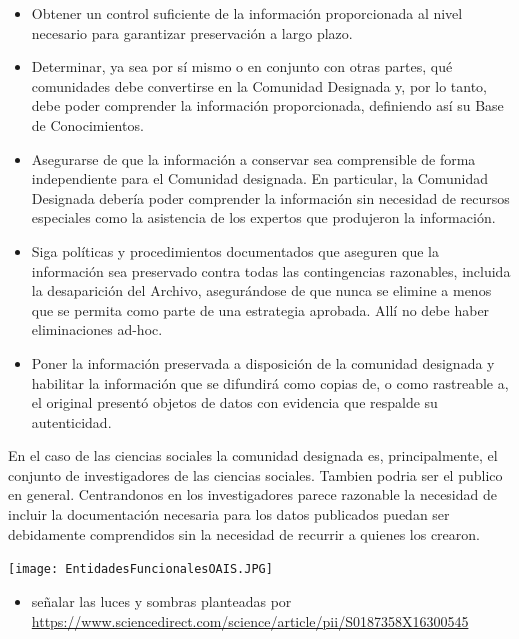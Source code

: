 \documentclass[
  14pt,
]{book}
\providecommand{\tightlist}{%
  \setlength{\itemsep}{0pt}\setlength{\parskip}{0pt}}
\let\origfigure\figure
\let\endorigfigure\endfigure
\renewenvironment{figure}[1][2] {
  \expandafter\origfigure\expandafter[H]
} {
  \endorigfigure
}
\begin{document}
\begin{itemize}
\item
  Obtener un control suficiente de la información proporcionada al nivel necesario para garantizar preservación a largo plazo.
\item
  Determinar, ya sea por sí mismo o en conjunto con otras partes, qué comunidades
  debe convertirse en la Comunidad Designada y, por lo tanto, debe poder
  comprender la información proporcionada, definiendo así su Base de Conocimientos.
\item
  Asegurarse de que la información a conservar sea comprensible de forma independiente para el
  Comunidad designada. En particular, la Comunidad Designada debería poder
  comprender la información sin necesidad de recursos especiales como la asistencia de
  los expertos que produjeron la información.
\item
  Siga políticas y procedimientos documentados que aseguren que la información sea
  preservado contra todas las contingencias razonables, incluida la desaparición del Archivo,
  asegurándose de que nunca se elimine a menos que se permita como parte de una estrategia aprobada. Allí
  no debe haber eliminaciones ad-hoc.
\item
  Poner la información preservada a disposición de la comunidad designada y habilitar
  la información que se difundirá como copias de, o como rastreable a, el original
  presentó objetos de datos con evidencia que respalde su autenticidad.
\end{itemize}

En el caso de las ciencias sociales la comunidad designada es, principalmente, el conjunto de investigadores de las ciencias sociales. Tambien podria ser el publico en general. Centrandonos en los investigadores parece razonable la necesidad de incluir la documentación necesaria para los datos publicados puedan ser debidamente comprendidos sin la necesidad de recurrir a quienes los crearon.

\begin{figure}
\centering
\texttt{[image: EntidadesFuncionalesOAIS.JPG]}
\caption{EntidadesF uncionales OAIS}
\end{figure}

\begin{itemize}
\tightlist
\item
  señalar las luces y sombras planteadas por \url{https://www.sciencedirect.com/science/article/pii/S0187358X16300545}
\end{itemize}
\end{document}
